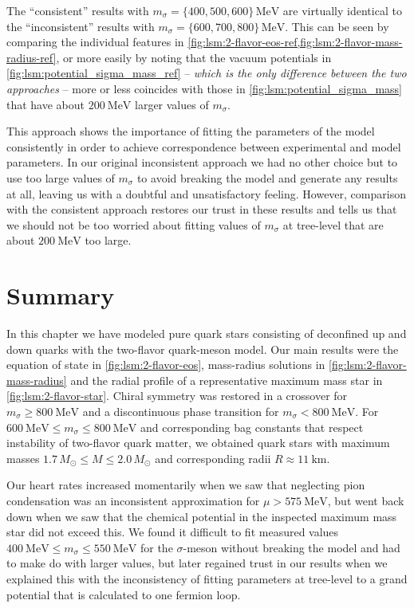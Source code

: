 The ``consistent'' results with $m_\sigma=\{400,500,600\} \, \si{\mega\electronvolt}$ are
virtually identical to the ``inconsistent'' results with $m_\sigma=\{600,700,800\} \, \si{\mega\electronvolt}$.
This can be seen by comparing the individual features in \cref{fig:lsm:2-flavor-eos-ref,fig:lsm:2-flavor-mass-radius-ref},
or more easily by noting that the vacuum potentials in \cref{fig:lsm:potential_sigma_mass_ref}
-- \emph{which is the only difference between the two approaches} --
more or less coincides with those in \cref{fig:lsm:potential_sigma_mass} that have about $\SI{200}{\mega\electronvolt}$ larger values of $m_\sigma$.

This approach shows the importance of fitting the parameters of the model consistently
in order to achieve correspondence between experimental and model parameters.
In our original inconsistent approach we had no other choice but to use too large values of $m_\sigma$ to avoid breaking the model and generate any results at all,
leaving us with a doubtful and unsatisfactory feeling.
However, comparison with the consistent approach restores our trust in these results
and tells us that we should not be too worried about 
fitting values of $m_\sigma$ at tree-level that are about $\SI{200}{\mega\electronvolt}$ too large.

\section{Summary}

In this chapter we have modeled pure quark stars consisting of deconfined up and down quarks with the two-flavor quark-meson model.
Our main results were the equation of state in \cref{fig:lsm:2-flavor-eos}, mass-radius solutions in \cref{fig:lsm:2-flavor-mass-radius} and the radial profile of a representative maximum mass star in \cref{fig:lsm:2-flavor-star}.
Chiral symmetry was restored in a crossover for $m_\sigma \geq \SI{800}{\mega\electronvolt}$ and a discontinuous phase transition for $m_\sigma < \SI{800}{\mega\electronvolt}$.
For $\SI{600}{\mega\electronvolt} \leq m_\sigma \leq \SI{800}{\mega\electronvolt}$ and corresponding bag constants that respect instability of two-flavor quark matter,
we obtained quark stars with maximum masses $1.7 \, M_\odot \leq M \leq 2.0 \, M_\odot$ and corresponding radii $R \approx \SI{11}{\kilo\meter}$.

Our heart rates increased momentarily when we saw that neglecting pion condensation was an inconsistent approximation for $\mu > \SI{575}{\mega\electronvolt}$,
but went back down when we saw that the chemical potential in the inspected maximum mass star did not exceed this.
We found it difficult to fit measured values $\SI{400}{\mega\electronvolt} \leq m_\sigma \leq \SI{550}{\mega\electronvolt}$ for the $\sigma$-meson without breaking the model and had to make do with larger values,
but later regained trust in our results when we explained this with the inconsistency of fitting parameters at tree-level to a grand potential that is calculated to one fermion loop.

